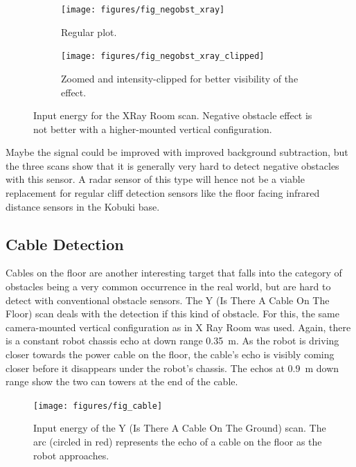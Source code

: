 \begin{figure}[htbp]
    \centering
    \begin{subfigure}[t]{.475\textwidth}
        \texttt{[image: figures/fig\_negobst\_xray]}
        \caption{Regular plot.}
        \label{fig:negobst_xray}
    \end{subfigure}%
    \hfill%
    \begin{subfigure}[t]{.475\textwidth}
        \texttt{[image: figures/fig\_negobst\_xray\_clipped]}
        \caption{Zoomed and intensity-clipped for better visibility of the effect.}
        \label{fig:negobst_xray_clipped}
    \end{subfigure}
    \caption{Input energy for the XRay Room scan. Negative obstacle effect is not better with a higher-mounted vertical configuration.}
\end{figure}


Maybe the signal could be improved with improved background subtraction, but the three scans show that it is generally very hard to
detect negative obstacles with this sensor. A radar sensor of this type
will hence not be a viable replacement for regular cliff detection
sensors like the floor facing infrared distance sensors in the Kobuki
base.


\subsection{Cable Detection}\label{cable-detection}
Cables on the floor are another interesting target that falls into the
category of obstacles being a very common occurrence in the real world,
but are hard to detect with conventional obstacle sensors. The Y (Is
There A Cable On The Floor) scan deals with the detection if this kind
of obstacle. For this, the same camera-mounted vertical configuration as
in X Ray Room was used. Again, there is a constant robot chassis echo at
down range \SI{0.35}{m}. As the robot is driving closer towards the power cable
on the floor, the cable's echo is visibly coming closer before it
disappears under the robot's chassis. The echos at \SI{0.9}{m} down range show
the two can towers at the end of the cable.

\begin{figure}[htp]
    \centering
    \texttt{[image: figures/fig\_cable]}
    \caption{Input energy of the Y (Is There A Cable On The Ground) scan. The arc (circled in red) represents the echo of a cable on the floor as the robot approaches.}
    \label{fig:cable}
\end{figure}

